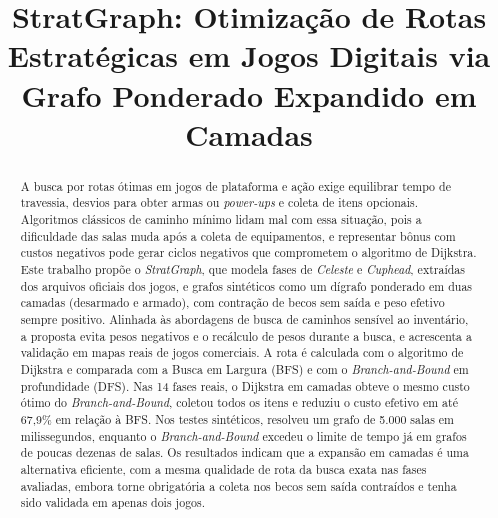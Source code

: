 \documentclass[conference]{IEEEtran}
\begin{document}
\title{StratGraph: Otimiza\c{c}\~ao de Rotas Estrat\'egicas em Jogos Digitais via Grafo Ponderado Expandido em Camadas}


\author{
\and
{}
\and
{}
}

\maketitle

\begin{abstract}
A busca por rotas \'otimas em jogos de plataforma e a\c{c}\~ao exige equilibrar tempo de travessia, desvios para obter armas ou \textit{power-ups} e coleta de itens opcionais. Algoritmos cl\'assicos de caminho m\'inimo lidam mal com essa situa\c{c}\~ao, pois a dificuldade das salas muda ap\'os a coleta de equipamentos, e representar b\^onus com custos negativos pode gerar ciclos negativos que comprometem o algoritmo de Dijkstra. Este trabalho prop\~oe o \textit{StratGraph}, que modela fases de \textit{Celeste} e \textit{Cuphead}, extra\'idas dos arquivos oficiais dos jogos, e grafos sint\'eticos como um d\'igrafo ponderado em duas camadas (desarmado e armado), com contra\c{c}\~ao de becos sem sa\'ida e peso efetivo sempre positivo. Alinhada \`as abordagens de busca de caminhos sens\'ivel ao invent\'ario, a proposta evita pesos negativos e o rec\'alculo de pesos durante a busca, e acrescenta a valida\c{c}\~ao em mapas reais de jogos comerciais. A rota \'e calculada com o algoritmo de Dijkstra e comparada com a Busca em Largura (BFS) e com o \textit{Branch-and-Bound} em profundidade (DFS). Nas 14 fases reais, o Dijkstra em camadas obteve o mesmo custo \'otimo do \textit{Branch-and-Bound}, coletou todos os itens e reduziu o custo efetivo em at\'e 67,9\% em rela\c{c}\~ao \`a BFS. Nos testes sint\'eticos, resolveu um grafo de 5.000 salas em milissegundos, enquanto o \textit{Branch-and-Bound} excedeu o limite de tempo j\'a em grafos de poucas dezenas de salas. Os resultados indicam que a expans\~ao em camadas \'e uma alternativa eficiente, com a mesma qualidade de rota da busca exata nas fases avaliadas, embora torne obrigat\'oria a coleta nos becos sem sa\'ida contra\'idos e tenha sido validada em apenas dois jogos.
\end{abstract}
\end{document}
